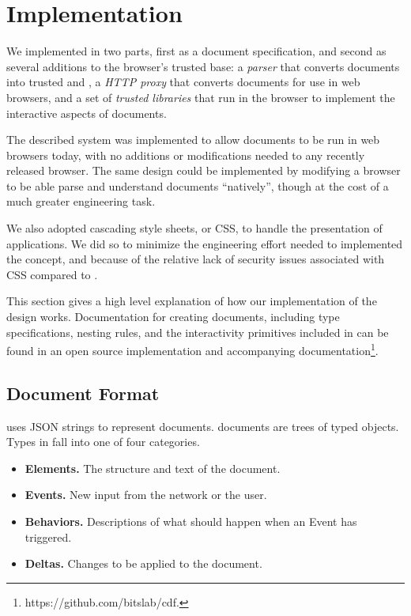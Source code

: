 \section{Implementation}
\label{future-web:implementation}

We implemented \CDF in two parts, first as a document specification, and second
as several additions to the browser's trusted base: a \emph{parser} that converts \CDF documents into
trusted \HTML and \JS, a \emph{HTTP proxy} that converts \CDF documents for use
in web browsers, and a set of \emph{trusted \JS libraries} that run in
the browser to implement the interactive aspects of \CDF documents.

The described system was implemented to allow \CDF documents to be run in
web browsers today, with no additions or modifications needed to any recently
released browser.  The same design could be implemented by modifying a browser
to be able parse and understand \CDF documents ``natively'', though at the cost
of a much greater engineering task.

We also adopted cascading style sheets, or CSS, to handle the presentation
of \CDF applications.  We did so to minimize the engineering effort needed
to implemented the \CDF concept, and because of the relative lack of security
issues associated with CSS compared to \JS.

This section gives a high level explanation of how our implementation
of the \CDF design works.  Documentation for creating \CDF documents, including
type specifications, nesting rules, and the interactivity primitives
included in \CDF can be found in an open source implementation and accompanying
documentation\footnote{https://github.com/bitslab/cdf.}.

\subsection{Document Format}
\CDF uses JSON strings to represent documents.  \CDF documents are
trees of typed objects.  Types in \CDF fall into one of four categories.

\begin{itemize}
     \setlength{\itemsep}{-2pt}
  \item \textbf{Elements.} The structure and text of the document.
  \item \textbf{Events.} New input from the network or the user.
  \item \textbf{Behaviors.} Descriptions of what should happen when an Event has
                   triggered.
  \item \textbf{Deltas.} Changes to be applied to the document.
\end{itemize}

